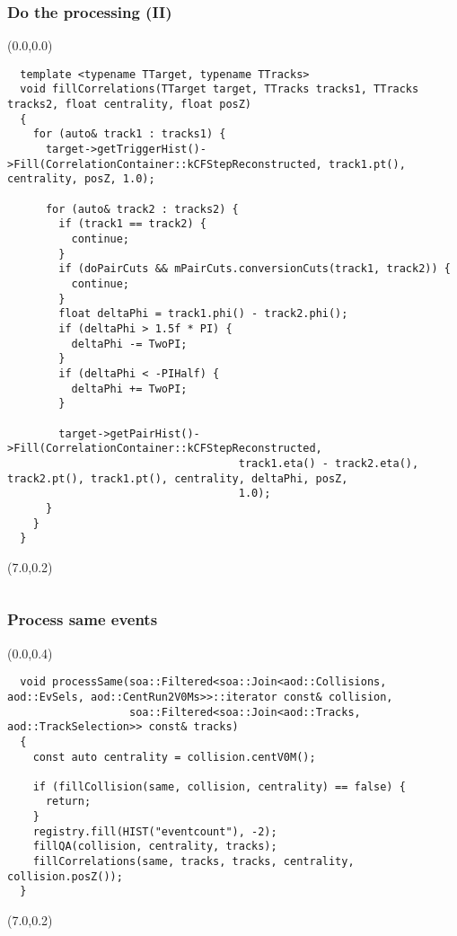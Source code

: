 \documentclass[14pt,aspectratio=169,t]{beamer}
\begin{document}
\begin{frame}[fragile]
  \frametitle{Do the processing (II)}
  \begin{textblock}{6}(0.0,0.0)
    {\tiny\color{blue}
    \vspace{-0.0in}
    \begin{verbatim}
  template <typename TTarget, typename TTracks>
  void fillCorrelations(TTarget target, TTracks tracks1, TTracks tracks2, float centrality, float posZ)
  {
    for (auto& track1 : tracks1) {
      target->getTriggerHist()->Fill(CorrelationContainer::kCFStepReconstructed, track1.pt(), centrality, posZ, 1.0);

      for (auto& track2 : tracks2) {
        if (track1 == track2) {
          continue;
        }
        if (doPairCuts && mPairCuts.conversionCuts(track1, track2)) {
          continue;
        }
        float deltaPhi = track1.phi() - track2.phi();
        if (deltaPhi > 1.5f * PI) {
          deltaPhi -= TwoPI;
        }
        if (deltaPhi < -PIHalf) {
          deltaPhi += TwoPI;
        }

        target->getPairHist()->Fill(CorrelationContainer::kCFStepReconstructed,
                                    track1.eta() - track2.eta(), track2.pt(), track1.pt(), centrality, deltaPhi, posZ,
                                    1.0);
      }
    }
  }
    \end{verbatim}}
  \end{textblock}
  \begin{textblock}{6}(7.0,0.2)
    {\tiny\color{blue}
    \vspace{-0.0in}
    \begin{verbatim}
    \end{verbatim}}
  \end{textblock}
\end{frame}


\begin{frame}[fragile]
  \frametitle{Process same events}
  \begin{textblock}{6}(0.0,0.4)
    {\tiny\color{blue}
    \vspace{-0.0in}
    \begin{verbatim}
  void processSame(soa::Filtered<soa::Join<aod::Collisions, aod::EvSels, aod::CentRun2V0Ms>>::iterator const& collision, 
                   soa::Filtered<soa::Join<aod::Tracks, aod::TrackSelection>> const& tracks)
  {
    const auto centrality = collision.centV0M();

    if (fillCollision(same, collision, centrality) == false) {
      return;
    }
    registry.fill(HIST("eventcount"), -2);
    fillQA(collision, centrality, tracks);
    fillCorrelations(same, tracks, tracks, centrality, collision.posZ());
  }
    \end{verbatim}}
  \end{textblock}
  \begin{textblock}{6}(7.0,0.2)
    {\tiny\color{blue}
    \vspace{-0.0in}
    \begin{verbatim}
    \end{verbatim}}
  \end{textblock}
\end{frame}
\end{document}
